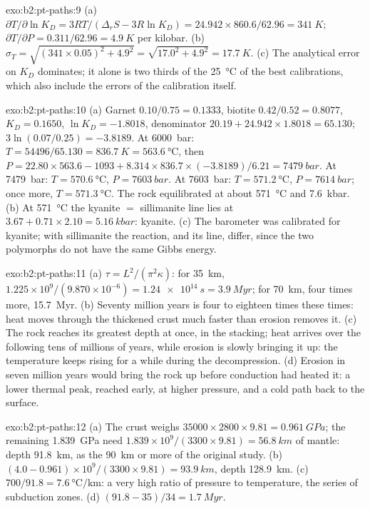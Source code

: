 \begin{solution}{exo:b2:pt-paths:9}
(a) $\partial T/\partial\ln K_D = 3RT/(\Delta_r S - 3R\ln K_D) = 24.942\times860.6/62.96 =
\qty{341}{K}$; $\partial T/\partial P = 0.311/62.96 = \qty{4.9}{K}$ per kilobar.
(b) $\sigma_T = \sqrt{(341\times0.05)^2 + 4.9^2} = \sqrt{17.0^2 + 4.9^2} =
\qty{17.7}{K}$. (c) The analytical error on $K_D$ dominates; it alone is two thirds of
the \qty{25}{\celsius} of the best calibrations, which also include the errors of the
calibration itself.
\end{solution}

\begin{solution}{exo:b2:pt-paths:10}
(a) Garnet $0.10/0.75 = 0.1333$, biotite $0.42/0.52 = 0.8077$, $K_D = 0.1650$, $\ln K_D =
-1.8018$, denominator $20.19 + 24.942\times1.8018 = 65.130$; $3\ln(0.07/0.25) = -3.8189$.
At \qty{6000}{bar}: $T = 54496/65.130 = \qty{836.7}{K} = \qty{563.6}{\celsius}$, then $P
= 22.80\times563.6 - 1093 + 8.314\times836.7\times(-3.8189)/6.21 = \qty{7479}{bar}$.
At \qty{7479}{bar}: $T = \qty{570.6}{\celsius}$, $P = \qty{7603}{bar}$. At
\qty{7603}{bar}: $T = \qty{571.2}{\celsius}$, $P = \qty{7614}{bar}$; once more, $T =
\qty{571.3}{\celsius}$. The rock equilibrated at about \qty{571}{\celsius} and
\qty{7.6}{kbar}. (b) At \qty{571}{\celsius} the kyanite $=$ sillimanite line lies at $3.67
+ 0.71\times2.10 = \qty{5.16}{kbar}$: kyanite. (c) The barometer was calibrated for
kyanite; with sillimanite the reaction, and its line, differ, since the two polymorphs do
not have the same Gibbs energy.
\end{solution}

\begin{solution}{exo:b2:pt-paths:11}
(a) $\tau = L^2/(\pi^2\kappa)$: for \qty{35}{km}, $1.225\times10^9/(9.870\times10^{-6}) =
\qty{1.24e14}{s} = \qty{3.9}{Myr}$; for \qty{70}{km}, four times more,
\qty{15.7}{Myr}. (b) Seventy million years is four to eighteen times these times: heat
moves through the thickened crust much faster than erosion removes it. (c) The rock
reaches its greatest depth at once, in the stacking; heat arrives over the following
tens of millions of years, while erosion is slowly bringing it up: the temperature keeps
rising for a while during the decompression. (d) Erosion in seven million years would
bring the rock up before conduction had heated it: a lower thermal peak, reached
early, at higher pressure, and a cold path back to the surface.
\end{solution}

\begin{solution}{exo:b2:pt-paths:12}
(a) The crust weighs $35000\times2800\times9.81 = \qty{0.961}{GPa}$; the remaining
\qty{1.839}{GPa} need $1.839\times10^9/(3300\times9.81) = \qty{56.8}{km}$ of mantle: depth
\qty{91.8}{km}, as the \qty{90}{km} or more of the original study. (b) $(4.0 -
0.961)\times10^9/(3300\times9.81) = \qty{93.9}{km}$, depth \qty{128.9}{km}.
(c) $700/91.8 = \qty{7.6}{\celsius\per\km}$: a very high ratio of pressure to
temperature, the series of subduction zones. (d) $(91.8 - 35)/34 = \qty{1.7}{Myr}$.
\end{solution}

